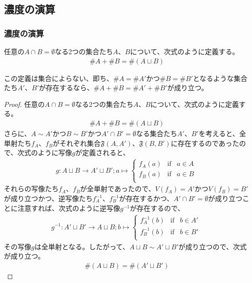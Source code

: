 \documentclass[dvipdfmx]{jsarticle}
\begin{document}
\subsection{濃度の演算}%
\subsubsection{濃度の演算}%
\begin{dfn}
任意の$A \cap B = \emptyset $なる2つの集合たち$A$、$B$について、次式のように定義する。
\begin{align*}
\# A + \# B = \# (A \sqcup B)
\end{align*}
\end{dfn}
\begin{thm}\label{1.2.8.1}
この定義は集合によらない、即ち、$\# A = \# A'$かつ$\# B = \# B'$となるような集合たち$A'$、$B'$が存在するなら、$\# A + \# B = \# A' + \# B'$が成り立つ。
\end{thm}
\begin{proof}
任意の$A \cap B = \emptyset $なる2つの集合たち$A$、$B$について、次式のように定義する。
\begin{align*}
\# A + \# B = \# (A \sqcup B)
\end{align*}
さらに、$A \sim A'$かつ$B \sim B'$かつ$A' \cap B' = \emptyset $なる集合たち$A'$、$B'$を考えると、全単射たち$f_{A}$、$f_{B}$がそれぞれ集合$\mathfrak{F}\left( A,A' \right)$、$\mathfrak{F}\left( B,B' \right)$に存在するのであったので、次式のように写像$g$が定義されると、
\begin{align*}
g:A \sqcup B \rightarrow A' \sqcup B';a \mapsto \left\{ \begin{matrix}
f_{A}(a) & {\mathrm{if}} & a \in A \\
f_{B}(a) & {\mathrm{if}} & a \in B \\
\end{matrix} \right.\ 
\end{align*}
それらの写像たち$f_{A}$、$f_{B}$が全単射であったので、$V\left( f_{A} \right) = A'$かつ$V\left( f_{B} \right) = B'$が成り立つかつ、逆写像たち$f_{A}^{- 1}$、$f_{B}^{- 1}$が存在するかつ、$A' \cap B' = \emptyset $が成り立つことに注意すれば、次式のように逆写像$g^{- 1}$が存在するので、
\begin{align*}
g^{- 1}:A' \sqcup B' \rightarrow A \sqcup B;b \mapsto \left\{ \begin{matrix}
f_{A}^{- 1}(b) & {\mathrm{if}} & b \in A' \\
f_{B}^{- 1}(b) & {\mathrm{if}} & b \in B' \\
\end{matrix} \right.\ 
\end{align*}
その写像$g$は全単射となる。したがって、$A \sqcup B \sim A' \sqcup B'$が成り立つので、次式が成り立つ。
\begin{align*}
\# (A \sqcup B) = \# \left( A' \sqcup B' \right)
\end{align*}
\end{proof}
\end{document}
